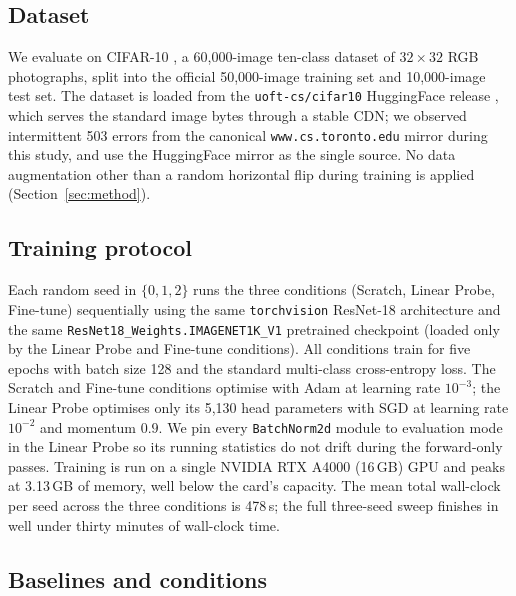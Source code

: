 \documentclass[11pt,twocolumn]{article}
\begin{document}
\subsection{Dataset}

We evaluate on CIFAR-10 \cite{krizhevsky2009learning}, a 60{,}000-image
ten-class dataset of $32{\times}32$ RGB photographs, split into the
official 50{,}000-image training set and 10{,}000-image test set. The
dataset is loaded from the \texttt{uoft-cs/cifar10} HuggingFace
release \cite{lhoest2021datasets}, which serves the standard image
bytes through a stable CDN; we observed intermittent 503 errors from
the canonical \texttt{www.cs.toronto.edu} mirror during this study,
and use the HuggingFace mirror as the single source. No data
augmentation other than a random horizontal flip during training is
applied (Section~\ref{sec:method}).

\subsection{Training protocol}

Each random seed in $\{0, 1, 2\}$ runs the three conditions
(Scratch, Linear Probe, Fine-tune) sequentially using the same
\texttt{torchvision} ResNet-18 architecture and the same
\texttt{ResNet18\_Weights.IMAGENET1K\_V1} pretrained checkpoint
(loaded only by the Linear Probe and Fine-tune conditions). All
conditions train for five epochs with batch size 128 and the standard
multi-class cross-entropy loss. The Scratch and Fine-tune conditions
optimise with Adam \cite{kingma2015adam} at learning rate $10^{-3}$;
the Linear Probe optimises only its 5{,}130 head parameters with SGD
at learning rate $10^{-2}$ and momentum $0.9$. We pin every
\texttt{BatchNorm2d} module to evaluation mode in the Linear Probe so
its running statistics do not drift during the forward-only passes.
Training is run on a single NVIDIA RTX A4000 (16\,GB) GPU and peaks
at 3.13\,GB of memory, well below the
card's capacity. The mean total wall-clock per seed across the three
conditions is 478\,s; the full three-seed
sweep finishes in well under thirty minutes of wall-clock time.

\subsection{Baselines and conditions}
\end{document}

